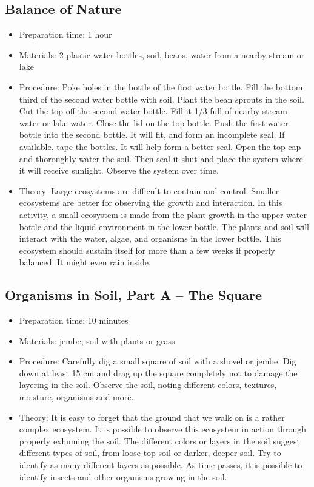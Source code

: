 \subsection{Balance of Nature}
\begin{itemize}
\item{Preparation time: 1 hour}
\item{Materials: 2 plastic water bottles, soil, beans, water from a nearby stream or lake}
\item{Procedure: Poke holes in the bottle of the first water bottle. Fill the bottom third of the second water bottle with soil. Plant the bean sprouts in the soil. Cut the top off the second water bottle. Fill it 1/3 full of nearby stream water or lake water. Close the lid on the top bottle. Push the first water bottle into the second bottle. It will fit, and form an incomplete seal. If available, tape the bottles. It will help form a better seal. Open the top cap and thoroughly water the soil. Then seal it shut and place the system where it will receive sunlight. Observe the system over time. }
\item{Theory: Large ecosystems are difficult to contain and control. Smaller ecosystems are better for observing the growth and interaction. In this activity, a small ecosystem is made from the plant growth in the upper water bottle and the liquid environment in the lower bottle. The plants and soil will interact with the water, algae, and organisms in the lower bottle. This ecosystem should sustain itself for more than a few weeks if properly balanced. It might even rain inside.}
\end{itemize}

\subsection{Organisms in Soil, Part A – The Square}
\begin{itemize}
\item{Preparation time: 10 minutes}
\item{Materials: jembe, soil with plants or grass}
\item{Procedure: Carefully dig a small square of soil with a shovel or jembe. Dig down at least 15 cm and drag up the square completely not to damage the layering in the soil. Observe the soil, noting different colors, textures, moisture, organisms and more.}
\item{Theory: It is easy to forget that the ground that we walk on is a rather complex ecosystem. It is possible to observe this ecosystem in action through properly exhuming the soil. The different colors or layers in the soil suggest different types of soil, from loose top soil or darker, deeper soil. Try to identify as many different layers as possible. As time passes, it is possible to identify insects and other organisms growing in the soil.}
\end{itemize}

